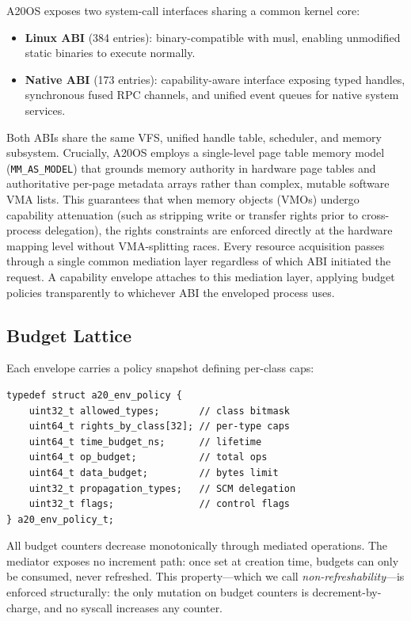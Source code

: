 \documentclass[letterpaper,twocolumn,10pt]{article}
\begin{document}
A20OS exposes two system-call interfaces sharing a common kernel core:

\begin{itemize}
\item \textbf{Linux ABI} (384 entries): binary-compatible with musl,
      enabling unmodified static binaries to execute normally.
\item \textbf{Native ABI} (173 entries): capability-aware interface
      exposing typed handles, synchronous fused RPC channels, and unified
      event queues for native system services.
\end{itemize}

Both ABIs share the same VFS, unified handle table, scheduler, and memory
subsystem.  Crucially, A20OS employs a single-level page table memory model
(\texttt{MM\_AS\_MODEL}) that grounds memory authority in hardware page
tables and authoritative per-page metadata arrays rather than complex,
mutable software VMA lists.  This guarantees that when memory objects (VMOs)
undergo capability attenuation (such as stripping write or transfer rights
prior to cross-process delegation), the rights constraints are enforced directly
at the hardware mapping level without VMA-splitting races.  Every resource
acquisition passes through a single common mediation layer regardless of
which ABI initiated the request.  A capability envelope attaches to this
mediation layer, applying budget policies transparently to whichever ABI the
enveloped process uses.

\subsection{Budget Lattice}

Each envelope carries a policy snapshot defining per-class caps:

\begin{lstlisting}[basicstyle=\footnotesize\ttfamily,columns=flexible]
typedef struct a20_env_policy {
    uint32_t allowed_types;       // class bitmask
    uint64_t rights_by_class[32]; // per-type caps
    uint64_t time_budget_ns;      // lifetime
    uint64_t op_budget;           // total ops
    uint64_t data_budget;         // bytes limit
    uint32_t propagation_types;   // SCM delegation
    uint32_t flags;               // control flags
} a20_env_policy_t;
\end{lstlisting}

All budget counters decrease monotonically through mediated operations.
The mediator exposes no increment path: once set at creation time,
budgets can only be consumed, never refreshed.  This property---which
we call \emph{non-refreshability}---is enforced structurally: the only
mutation on budget counters is decrement-by-charge, and no syscall
increases any counter.
\end{document}
